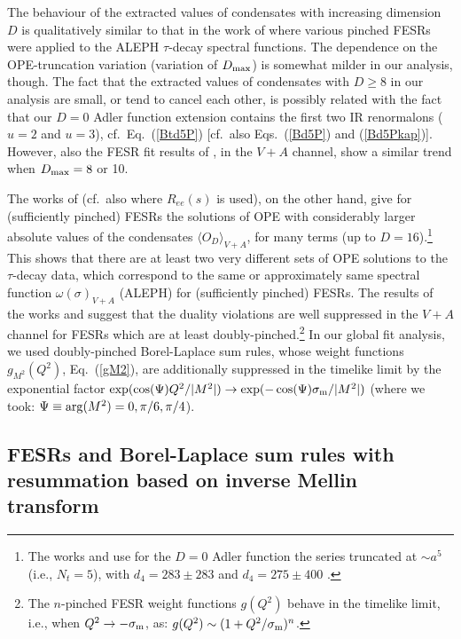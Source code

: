 \documentclass[aps,nofootinbib,showkeys,noshowpacs,preprintnumbers,amsmath,amssymb]{revtex4}
\newcommand{\sm}{{\sigma_{\rm m}}}
\begin{document}
The behaviour of the extracted values of condensates with increasing dimension $D$ is qualitatively similar to that in the work of \cite{Pich} where various pinched FESRs were applied to the ALEPH $\tau$-decay spectral functions. The dependence on the OPE-truncation variation (variation of $D_{\rm max}$) is somewhat milder in our analysis, though. The fact that the extracted values of condensates with $D \geq 8$  in our analysis are small, or tend to cancel each other, is possibly related with the fact that our $D=0$ Adler function extension contains the first two IR renormalons ($u=2$ and $u=3$), cf.~Eq.~(\ref{Btd5P}) [cf.~also Eqs.~(\ref{Bd5P}) and (\ref{Bd5Pkap})]. However, also the FESR fit results of \cite{Pich}, in the $V+A$ channel, show a similar trend when $D_{\rm max}=8$ or 10. 

The works of \cite{Bo2015,Bo2017} (cf.~also \cite{BoRee2019} where $R_{ee}(s)$ is used), on the other hand, give for (sufficiently pinched) FESRs the solutions of OPE with considerably larger absolute values of the condensates $\langle O_D \rangle_{V+A}$, for many terms (up to $D=16$).\footnote{
The works \cite{Bo2015,Bo2017} and \cite{Pich} use for the $D=0$ Adler function the series truncated at $\sim a^5$ (i.e., $N_t=5$), with $d_4 = 283 \pm 283$ \cite{Bo2015,Bo2017} and $d_4=275 \pm 400$ \cite{Pich}.}
This shows that there are at least two very different sets of OPE solutions to the $\tau$-decay data, which correspond to the same or approximately same spectral function $\omega(\sigma)_{V+A}$ (ALEPH) for (sufficiently pinched) FESRs. The results of the works \cite{Pich} and \cite{Bo2015,Bo2017} suggest that the duality violations are well suppressed in the $V+A$ channel for FESRs which are at least doubly-pinched.\footnote{The $n$-pinched FESR weight functions $g(Q^2)$ behave in the timelike limit, i.e., when $Q^2 \to -\sm$, as: $g(Q^2) \sim (1 + Q^2/\sm)^n$.} In our global fit analysis, we used doubly-pinched Borel-Laplace sum rules, whose weight functions $g_{M^2}(Q^2)$, Eq.~(\ref{gM2}), are additionally suppressed in the timelike limit by the exponential factor $\exp(\cos(\Psi) Q^2/|M^2|) \to \exp(- \cos(\Psi) \sm/|M^2|)$ (where we took: $\Psi \equiv {\rm arg}(M^2) = 0, \pi/6, \pi/4$).


\subsection{FESRs and Borel-Laplace sum rules with resummation based on inverse Mellin transform}
\label{subs:resiM}
\end{document}
